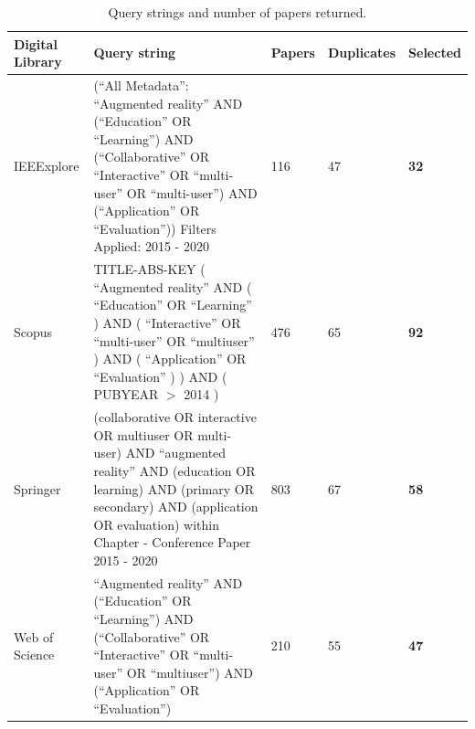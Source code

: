 \begin{table}[htbp]
\small
\centering
\caption {Query strings and number of papers returned.}\label{tab:searchstring}
\begin{tabular}{|M{1.9cm}||M{8cm}|M{1.25cm}|M{1.85cm}|M{1.45cm}|}
    \hline
         \textbf{Digital Library} & \textbf{Query string} & \textbf{Papers} & \textbf{Duplicates} & \textbf{Selected} \\
    \hline
    \hline
         IEEExplore    &  (``All Metadata'': ``Augmented reality'' AND (``Education'' OR ``Learning'') AND (``Collaborative'' OR ``Interactive'' OR ``multi-user'' OR ``multi-user'') AND (``Application'' OR ``Evaluation'')) Filters Applied: 2015 - 2020 & 116 & 47 & \textbf{32} \\
    \hline
        Scopus         & TITLE-ABS-KEY ( ``Augmented reality''  AND  ( ``Education''  OR  ``Learning'' )  AND  ( ``Interactive''  OR  ``multi-user''  OR  ``multiuser'' )  AND  ( ``Application''  OR  ``Evaluation'' ) )  AND  ( PUBYEAR $>$ 2014 )  & 476 & 65 & \textbf{92} \\
    \hline
        Springer       & (collaborative OR interactive OR multiuser OR multi-user) AND ``augmented reality'' AND (education OR learning) AND (primary OR secondary) AND (application OR evaluation)
within Chapter - Conference Paper  2015 - 2020  & 803 & 67 & \textbf{58} \\
    \hline
        Web of Science & ``Augmented reality'' AND (``Education'' OR ``Learning'') AND (``Collaborative'' OR ``Interactive'' OR ``multi-user'' OR ``multiuser'') AND (``Application'' OR ``Evaluation'') & 210 & 55 & \textbf{47} \\
    \hline

\end{tabular}
\end{table}